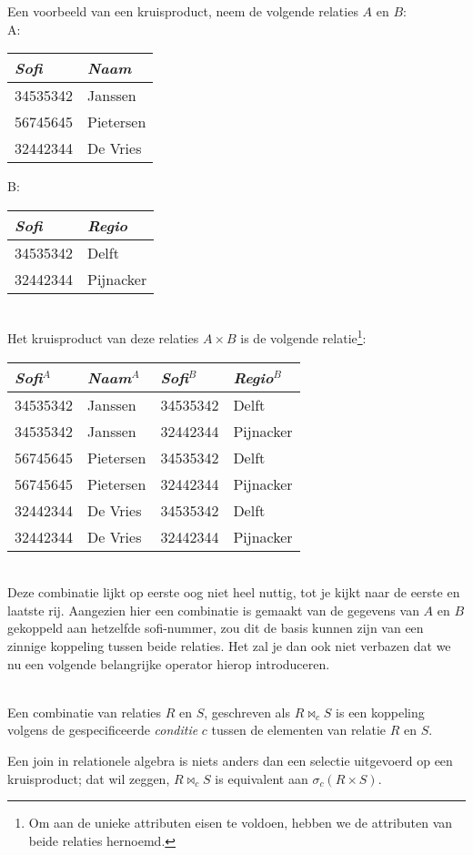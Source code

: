 \begin{aside}
Een voorbeeld van een kruisproduct, neem de volgende relaties $A$ en $B$:\\[2.5pt]
A: \begin{tabular}{|l|l|}
\hline
\textit{Sofi} & \textit{Naam}\\
\hline
34535342 & Janssen\\
56745645 & Pietersen\\
32442344 & De Vries\\
\hline
\end{tabular}
\hspace{1cm}B: \begin{tabular}{|l|l|}
\hline
\textit{Sofi} & \textit{Regio}\\
\hline
34535342 & Delft\\
32442344 & Pijnacker\\
\hline
\end{tabular}\\[2.5pt]
Het kruisproduct van deze relaties $A\times B$ is de volgende relatie\footnote{Om aan de unieke attributen eisen te voldoen, hebben we de attributen van beide relaties hernoemd.}:\\[2.5pt]
\begin{tabular}{|l|l|l|l|}
\hline
\textit{Sofi}$^A$ & \textit{Naam}$^A$ & \textit{Sofi}$^B$ & \textit{Regio}$^B$\\
\hline
34535342 & Janssen & 34535342 & Delft\\
34535342 & Janssen & 32442344 & Pijnacker\\
56745645 & Pietersen & 34535342 & Delft\\
56745645 & Pietersen & 32442344 & Pijnacker\\
32442344 & De Vries & 34535342 & Delft\\
32442344 & De Vries & 32442344 & Pijnacker\\
\hline
\end{tabular}\\[2.5pt]
Deze combinatie lijkt op eerste oog niet heel nuttig, tot je kijkt naar de eerste en laatste rij. Aangezien hier een combinatie is gemaakt van de gegevens van $A$ en $B$ gekoppeld aan hetzelfde sofi-nummer, zou dit de basis kunnen zijn van een zinnige koppeling tussen beide relaties. Het zal je dan ook niet verbazen dat we nu een volgende belangrijke operator hierop introduceren.
\begin{definition}[Join]\mbox{}\\
Een combinatie van relaties $R$ en $S$, geschreven als $R\Join_{c}S$ is een koppeling volgens de gespecificeerde \textit{conditie} $c$ tussen de elementen van relatie $R$ en $S$.
\end{definition}
Een join in relationele algebra is niets anders dan een selectie uitgevoerd op een kruisproduct; dat wil zeggen, $R\Join_c S$ is equivalent aan $\sigma_c(R\times S)$.


\end{aside}
